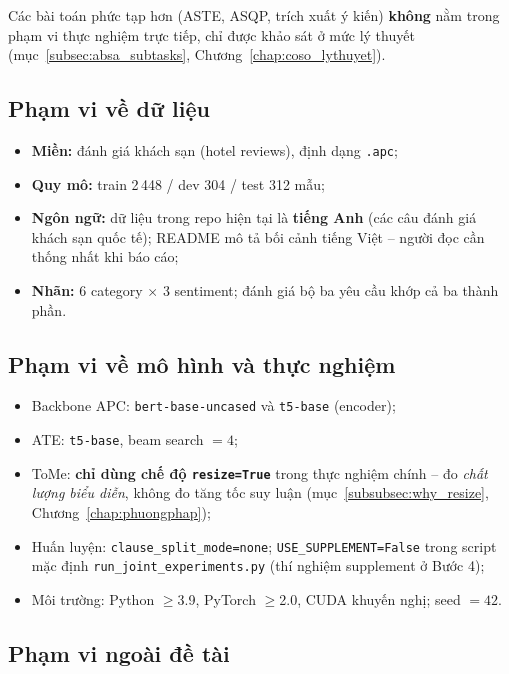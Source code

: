 Các bài toán phức tạp hơn (ASTE, ASQP, trích xuất ý kiến) \textbf{không} nằm trong phạm
vi thực nghiệm trực tiếp, chỉ được khảo sát ở mức lý thuyết (mục~\ref{subsec:absa_subtasks},
Chương~\ref{chap:coso_lythuyet}).

\subsection{Phạm vi về dữ liệu}

\begin{itemize}
  \item \textbf{Miền:} đánh giá khách sạn (hotel reviews), định dạng \texttt{.apc};
  \item \textbf{Quy mô:} train 2\,448 / dev 304 / test 312 mẫu;
  \item \textbf{Ngôn ngữ:} dữ liệu trong repo hiện tại là \textbf{tiếng Anh} (các câu
        đánh giá khách sạn quốc tế); README mô tả bối cảnh tiếng Việt -- người đọc cần
        thống nhất khi báo cáo;
  \item \textbf{Nhãn:} 6 category $\times$ 3 sentiment; đánh giá bộ ba yêu cầu khớp cả
        ba thành phần.
\end{itemize}

\subsection{Phạm vi về mô hình và thực nghiệm}

\begin{itemize}
  \item Backbone APC: \texttt{bert-base-uncased} và \texttt{t5-base} (encoder);
  \item ATE: \texttt{t5-base}, beam search $=4$;
  \item ToMe: \textbf{chỉ dùng chế độ \texttt{resize=True}} trong thực nghiệm chính -- đo
        \emph{chất lượng biểu diễn}, không đo tăng tốc suy luận (mục~\ref{subsubsec:why_resize},
        Chương~\ref{chap:phuongphap});
  \item Huấn luyện: \texttt{clause\_split\_mode=none}; \texttt{USE\_SUPPLEMENT=False} trong
        script mặc định \texttt{run\_joint\_experiments.py} (thí nghiệm supplement ở Bước 4);
  \item Môi trường: Python $\ge$3.9, PyTorch $\ge$2.0, CUDA khuyến nghị; seed $=42$.
\end{itemize}

\subsection{Phạm vi ngoài đề tài}

